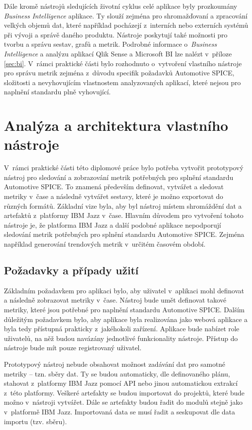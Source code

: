 \documentclass[czech,master]{diploma}
\begin{document}
Dále kromě nástrojů sledujících životní cyklus celé aplikace byly prozkoumány \textit{Business Intelligence} aplikace. Ty slouží zejména pro shromažďovaní a zpracování velkých objemů dat, které například pocházejí z~interních nebo externích systémů při vývoji a správě daného produktu. Nástroje poskytují také možnosti pro tvorbu a správu sestav, grafů a metrik. Podrobné informace o~\textit{Business Intelligence} a analýzu aplikací Qlik Sense a Microsoft BI lze nalézt v~příloze \ref{sec:bi}. V~rámci praktické části bylo rozhodnuto o~vytvoření vlastního nástroje pro správu metrik zejména z~důvodu specifik požadavků Automotive SPICE, složitosti a nevyhovujícím vlastnostem analyzovaných aplikací, které nejsou pro naplnění standardu plně vyhovující.

\chapter{Analýza a architektura vlastního nástroje}
\label{sec:my_app}
V~rámci  praktické části této diplomové práce bylo potřeba vytvořit  prototypový nástroj pro sledování a zobrazování metrik potřebných pro splnění standardu Automotive SPICE. To znamená především definovat, vytvářet a sledovat metriky v~čase a následně vytvářet sestavy, které je možno exportovat do různých formátů. Základní vize byla, aby byl nástroj místem shromáždění dat a artefaktů z~platformy IBM Jazz v~čase. Hlavním důvodem pro vytvoření tohoto nástroje je, že platforma IBM Jazz a další podobné aplikace nepodporují sledování metrik potřebných pro splnění standardu Automotive SPICE. Zejména například generování trendových metrik v~určitém časovém období.

\section{Požadavky a případy užití}
\label{sec:requirements}
Základním požadavkem pro aplikaci bylo, aby uživatel v~aplikaci mohl definovat a následně zobrazovat metriky v~čase. Nástroj bude umět definovat takové metriky, které jsou potřebné pro naplnění standardu Automotive SPICE. Dalším důležitým požadavkem bylo, aby aplikace byla realizována jako webová aplikace a byla tedy přístupná prakticky z~jakéhokoli zařízení. Aplikace bude nabízet role uživatelů, na něž budou navázány jednotlivé funkcionality nástroje. Přístup do nástroje bude mít pouze registrovaný uživatel.

Prototypový nástroj nebude obsahovat možnost zadávání dat pro samotné metriky -- tzn. sběry dat. Ty se budou automaticky, dle definovaného plánu, stahovat z~platformy IBM Jazz pomocí API nebo jinou automatickou extrakcí z~této platformy. Veškeré artefakty se budou importovat do projektů, které bude možno v~nástroji vytvářet. Dále se artefakty budou řadit do modulů stejně jako v~platformě IBM Jazz. Importovaná data se musí řadit a seskupovat dle data importu (tzv. sběru).
\end{document}
